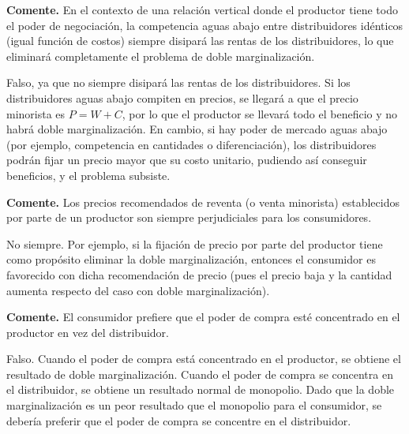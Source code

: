 \question \textbf{Comente.} En el contexto de una relación vertical donde el productor tiene todo el poder de negociación, la competencia aguas abajo entre distribuidores idénticos (igual función de costos) siempre disipará las rentas de los distribuidores, lo que eliminará completamente el problema de doble marginalización.
\begin{solution}
Falso, ya que no siempre disipará las rentas de los distribuidores. Si los distribuidores aguas abajo compiten en precios, se llegará a que el precio minorista es $P = W + C$, por lo que el productor se llevará todo el beneficio y no habrá doble marginalización. En cambio, si hay poder de mercado aguas abajo (por ejemplo, competencia en cantidades o diferenciación), los distribuidores podrán fijar un precio mayor que su costo unitario, pudiendo así conseguir beneficios, y el problema subsiste.

\end{solution}

\question \textbf{Comente.} Los precios recomendados de reventa (o venta minorista) establecidos por parte de un productor son siempre perjudiciales para los consumidores.
\begin{solution}
No siempre. Por ejemplo, si la fijación de precio por parte del productor tiene como propósito eliminar la doble marginalización, entonces el consumidor es favorecido con dicha recomendación de precio (pues el precio baja y la cantidad aumenta respecto del caso con doble marginalización).

\end{solution}

\question \textbf{Comente.} El consumidor prefiere que el poder de compra esté concentrado en el productor en vez del distribuidor.
\begin{solution}
Falso. Cuando el poder de compra está concentrado en el productor, se obtiene el resultado de doble marginalización. Cuando el poder de compra se concentra en el distribuidor, se obtiene un resultado normal de monopolio. Dado que la doble marginalización es un peor resultado que el monopolio para el consumidor, se debería preferir que el poder de compra se concentre en el distribuidor.

\end{solution}

